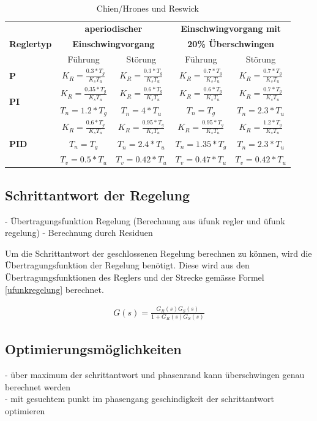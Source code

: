 \begin{table}
\centering
\renewcommand*{\arraystretch}{1.5}
\begin{tabular}{|l|c|c|c|c|}
\hline 
& \multicolumn{2}{c|}{\textbf{aperiodischer}} & \multicolumn{2}{c|}{\textbf{Einschwingvorgang mit}} \\
\textbf{Reglertyp} & \multicolumn{2}{c|}{\textbf{Einschwingvorgang}} & \multicolumn{2}{c|}{\textbf{20\% Überschwingen}}\\
\cline{2-5} 
 & Führung & Störung & Führung & Störung \\ 
\hline 
\textbf{P} & $K_R=\frac{0.3*T_g}{K_sT_u}$ & $K_R=\frac{0.3*T_g}{K_sT_u}$ & $K_R=\frac{0.7*T_g}{K_sT_u}$ & $K_R=\frac{0.7*T_g}{K_sT_u}$ \\ 
\hline 
\multirow{2}{*}{\textbf{PI}} & $K_R=\frac{0.35*T_g}{K_sT_u}$ & $K_R=\frac{0.6*T_g}{K_sT_u}$ & $K_R=\frac{0.6*T_g}{K_sT_u}$ & $K_R=\frac{0.7*T_g}{K_sT_u}$ \\ 
& $T_n=1.2*T_g$ & $T_n=4*T_u$ & $T_n=T_g$ & $T_n=2.3*T_u$ \\ 
\hline 
 & $K_R=\frac{0.6*T_g}{K_sT_u}$ & $K_R=\frac{0.95*T_g}{K_sT_u}$ & $K_R=\frac{0.95*T_g}{K_sT_u}$ & $K_R=\frac{1.2*T_g}{K_sT_u}$\\ 
\textbf{PID} & $T_n=T_g$ & $T_n=2.4*T_u$ &  $T_n=1.35*T_g$ & $T_n=2.3*T_u$ \\ 
 & $T_v=0.5*T_u$ & $T_v=0.42*T_u$ & $T_v=0.47*T_u$ & $T_v=0.42*T_u$ \\ 
\hline 
\end{tabular}
\renewcommand*{\arraystretch}{1}
\caption{Chien/Hrones und Reswick \cite{bate}} 
\end{table}


\newpage
\subsection{Schrittantwort der Regelung}
- Übertragungsfunktion Regelung (Berechnung aus üfunk regler und üfunk regelung)\newline
- Berechnung durch Residuen\newline

Um die Schrittantwort der geschlossenen Regelung berechnen zu können, wird die Übertragungsfunktion der Regelung benötigt. Diese wird aus den Übertragungsfunktionen des Reglers und der Strecke gemässe Formel \ref{ufunkregelung} berechnet.

\begin{align}
G(s)=\frac{G_R(s)G_S(s)}{1+G_R(s)G_S(s)}
\label{ufunkregelung}
\end{align}

\subsection{Optimierungsmöglichkeiten}
- über maximum der schrittantwort und phasenrand kann überschwingen genau berechnet werden\\
- mit gesuchtem punkt im phasengang geschindigkeit der schrittantwort optimieren
